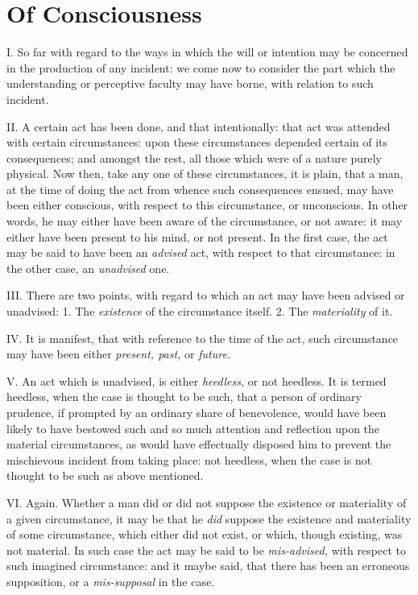 \documentclass[12pt]{report}
\begin{document}
\chapter{Of Consciousness}

I. So far with regard to the ways in which the will or intention may be
concerned in the production of any incident: we come now to consider the
part which the understanding or perceptive faculty may have borne, with
relation to such incident.

II. A certain act has been done, and that intentionally: that act was
attended with certain circumstances: upon these circumstances depended
certain of its consequences; and amongst the rest, all those which were
of a nature purely physical. Now then, take any one of these
circumstances, it is plain, that a man, at the time of doing the act
from whence such consequences ensued, may have been either conscious,
with respect to this circumstance, or unconscious. In other words, he
may either have been aware of the circumstance, or not aware: it may
either have been present to his mind, or not present. In the first case,
the act may be said to have been an \emph{advised} act, with respect to
that circumstance: in the other case, an \emph{unadvised} one.

III. There are two points, with regard to which an act may have been
advised or unadvised: 1. The \emph{existence} of the circumstance
itself. 2. The \emph{materiality} of it.

IV. It is manifest, that with reference to the time of the act, such
circumstance may have been either \emph{present, past,} or
\emph{future.}

V. An act which is unadvised, is either \emph{heedless,} or not
heedless. It is termed heedless, when the case is thought to be such,
that a person of ordinary prudence, if prompted by an ordinary share of
benevolence, would have been likely to have bestowed such and so much
attention and reflection upon the material circumstances, as would have
effectually disposed him to prevent the mischievous incident from taking
place: not heedless, when the case is not thought to be such as above
mentioned.

VI. Again. Whether a man did or did not suppose the existence or
materiality of a given circumstance, it may be that he \emph{did}
suppose the existence and materiality of some circumstance, which either
did not exist, or which, though existing, was not material. In such case
the act may be said to be \emph{mis-advised,} with respect to such
imagined circumstance: and it maybe said, that there has been an
erroneous supposition, or a \emph{mis-supposal} in the case.
\end{document}

